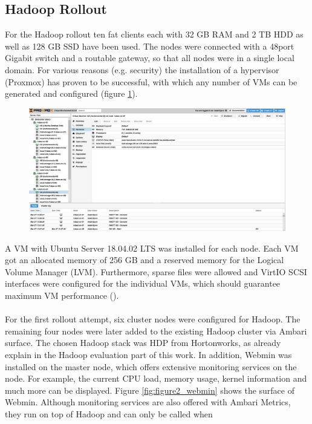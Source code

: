 \subsection{Hadoop Rollout}
For the Hadoop rollout ten fat clients each with 32 GB RAM and 2 TB HDD as well as 128 GB SSD
have been used. The nodes were connected with a 48port Gigabit switch and a routable gateway,
so that all nodes were in a single local domain. For various reasons (e.g. security) the installation
of a hypervisor (Proxmox) has proven to be successful, with which any number of VMs can be
generated and configured (figure \ref{fig:figure1_proxmox}).
\begin{figure}[H]
\hspace{-2.8cm}
\includegraphics[width=1.4\textwidth]{img/figure1_proxmox}\label{fig:figure1_proxmox}
\label{fig:figure1_proxmox}
\end{figure}
A VM with Ubuntu Server 18.04.02 LTS was installed for each node. Each VM got an allocated
memory of 256 GB and a reserved memory for the Logical Volume Manager (LVM). Furthermore,
sparse files were allowed and VirtIO SCSI interfaces were configured for the individual VMs, which
should guarantee maximum VM performance (\cite{RN1}).\\\\
For the first rollout attempt, six cluster nodes were configured for Hadoop. The remaining four nodes
were later added to the existing Hadoop cluster via Ambari surface. The chosen Hadoop stack
was HDP from Hortonworks, as already explain in the Hadoop evaluation part of this work. In
addition, Webmin was installed on the master node, which offers extensive monitoring services
on the node. For example, the current CPU load, memory usage, kernel information and much
more can be displayed. Figure \ref{fig:figure2_webmin} shows the surface of Webmin. Although monitoring services
are also offered with Ambari Metrics, they run on top of Hadoop and can only be called when
